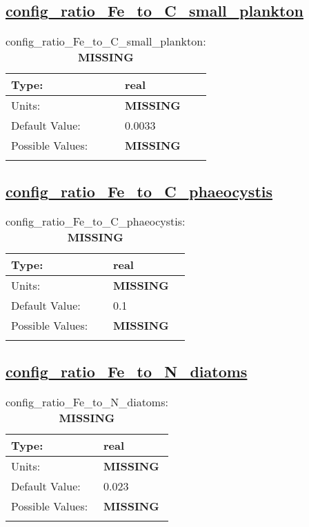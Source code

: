 \subsection[config\_ratio\_Fe\_to\_C\_small\_plankton]{\hyperref[sec:nm_tab_biogeochemistry]{config\_ratio\_Fe\_to\_C\_small\_plankton}}
\label{subsec:nm_sec_config_ratio_Fe_to_C_small_plankton}
\begin{center}
\begin{longtable}{| p{2.0in} || p{4.0in} |}
    \hline
    Type: & real \\
    \hline
    Units: & {\bf \color{red} MISSING} \\
    \hline
    Default Value: & 0.0033 \\
    \hline
    Possible Values: & {\bf \color{red} MISSING} \\
    \hline
    \caption{config\_ratio\_Fe\_to\_C\_small\_plankton: {\bf \color{red} MISSING}}
\end{longtable}
\end{center}
\subsection[config\_ratio\_Fe\_to\_C\_phaeocystis]{\hyperref[sec:nm_tab_biogeochemistry]{config\_ratio\_Fe\_to\_C\_phaeocystis}}
\label{subsec:nm_sec_config_ratio_Fe_to_C_phaeocystis}
\begin{center}
\begin{longtable}{| p{2.0in} || p{4.0in} |}
    \hline
    Type: & real \\
    \hline
    Units: & {\bf \color{red} MISSING} \\
    \hline
    Default Value: & 0.1 \\
    \hline
    Possible Values: & {\bf \color{red} MISSING} \\
    \hline
    \caption{config\_ratio\_Fe\_to\_C\_phaeocystis: {\bf \color{red} MISSING}}
\end{longtable}
\end{center}
\subsection[config\_ratio\_Fe\_to\_N\_diatoms]{\hyperref[sec:nm_tab_biogeochemistry]{config\_ratio\_Fe\_to\_N\_diatoms}}
\label{subsec:nm_sec_config_ratio_Fe_to_N_diatoms}
\begin{center}
\begin{longtable}{| p{2.0in} || p{4.0in} |}
    \hline
    Type: & real \\
    \hline
    Units: & {\bf \color{red} MISSING} \\
    \hline
    Default Value: & 0.023 \\
    \hline
    Possible Values: & {\bf \color{red} MISSING} \\
    \hline
    \caption{config\_ratio\_Fe\_to\_N\_diatoms: {\bf \color{red} MISSING}}
\end{longtable}
\end{center}

